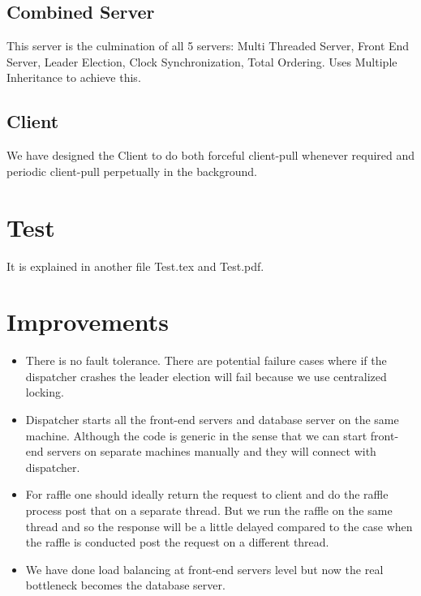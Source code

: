 \documentclass{article}
\begin{document}
\subsection{Combined Server}
This server is the culmination of all 5 servers: Multi Threaded Server, 
Front End Server, Leader Election, Clock Synchronization, Total Ordering.
Uses Multiple Inheritance to achieve this.

\subsection{Client}
We have designed the Client to do both forceful client-pull whenever required and periodic client-pull perpetually in the background.

\section{Test}
It is explained in another file Test.tex and Test.pdf.

\section{Improvements}
\begin{itemize}
\item There is no fault tolerance. There are potential failure cases where if the dispatcher crashes the leader election will fail because we use centralized locking.
\item Dispatcher starts all the front-end servers and database server on the same machine. Although the code is generic in the sense that we can start front-end servers on separate machines manually and they will connect with dispatcher.
\item For raffle one should ideally return the request to client and do the raffle process post that on a separate thread. But we run the raffle on the same thread and so the response will be a little delayed compared to the case when the raffle is conducted post the request on a different thread.
\item We have done load balancing at front-end servers level but now the real bottleneck becomes the database server.
\end{itemize}
\end{document}
